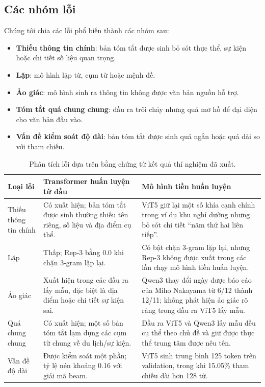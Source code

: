\documentclass[conference]{IEEEtran}
\begin{document}
\subsection{Các nhóm lỗi}
Chúng tôi chia các lỗi phổ biến thành các nhóm sau:
\begin{itemize}
    \item \textbf{Thiếu thông tin chính}: bản tóm tắt được sinh bỏ sót thực thể, sự kiện hoặc chi tiết số liệu quan trọng.
    \item \textbf{Lặp}: mô hình lặp từ, cụm từ hoặc mệnh đề.
    \item \textbf{Ảo giác}: mô hình sinh ra thông tin không được văn bản nguồn hỗ trợ.
    \item \textbf{Tóm tắt quá chung chung}: đầu ra trôi chảy nhưng quá mơ hồ để đại diện cho văn bản đầu vào.
    \item \textbf{Vấn đề kiểm soát độ dài}: bản tóm tắt được sinh quá ngắn hoặc quá dài so với tham chiếu.
\end{itemize}

\begin{table}[htbp]
\centering
\caption{Phân tích lỗi dựa trên bằng chứng từ kết quả thí nghiệm đã xuất.}
\label{tab:error_analysis}
\begin{tabular}{lp{}p{}}
\toprule
Loại lỗi & Transformer huấn luyện từ đầu & Mô hình tiền huấn luyện \\
\midrule
Thiếu thông tin chính & Có xuất hiện; bản tóm tắt được sinh thường thiếu tên riêng, số liệu và địa điểm cụ thể. & ViT5 giữ lại một số khía cạnh chính trong ví dụ khu nghỉ dưỡng nhưng bỏ sót chi tiết ``năm thứ hai liên tiếp''. \\
Lặp & Thấp; Rep-3 bằng 0.0 khi chặn 3-gram lặp lại. & Có bật chặn 3-gram lặp lại, nhưng Rep-3 không được xuất trong các lần chạy mô hình tiền huấn luyện. \\
Ảo giác & Xuất hiện trong các đầu ra lấy mẫu, đặc biệt là địa điểm hoặc chi tiết sự kiện sai. & Qwen3 thay đổi ngày được báo cáo của Miho Nakayama từ 6/12 thành 12/11; không phát hiện ảo giác rõ ràng trong đầu ra ViT5 lấy mẫu. \\
Quá chung chung & Có xuất hiện; một số bản tóm tắt lạm dụng các cụm từ chung về du lịch/sự kiện. & Đầu ra ViT5 và Qwen3 lấy mẫu đều cụ thể theo chủ đề và giữ được thực thể trung tâm được nêu tên. \\
Vấn đề độ dài & Được kiểm soát một phần; tỷ lệ nén khoảng 0.16 với giải mã beam. & ViT5 sinh trung bình 125 token trên validation, trong khi 15.05\% tham chiếu dài hơn 128 từ. \\
\bottomrule
\end{tabular}
\end{table}
\end{document}
